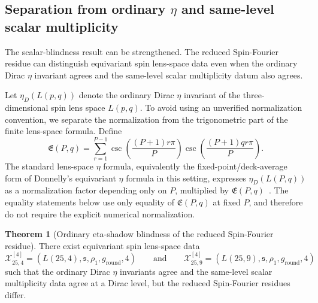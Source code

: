 \documentclass{article}
\theoremstyle{definition}
\newtheorem{theorem}{Theorem}[section]
\numberwithin{equation}{section}
\begin{document}
\subsection{Separation from ordinary $\eta$ and same-level scalar multiplicity}
\label{subsec:check-3B-ordinary-eta-blindness}

The scalar-blindness result can be strengthened.  The reduced Spin-Fourier residue can distinguish equivariant spin lens-space data even when the ordinary Dirac $\eta$ invariant agrees and the same-level scalar multiplicity datum also agrees.

Let $\eta_D(L(p,q))$ denote the ordinary Dirac $\eta$ invariant of the three-dimensional spin lens space $L(p,q)$.  To avoid using an unverified normalization convention, we separate the normalization from the trigonometric part of the finite lens-space formula.  Define
\begin{equation}
\mathfrak E(P,q)
=
\sum_{r=1}^{P-1}
\operatorname{csc}\left(\frac{(P+1)r\pi}{P}\right)
\operatorname{csc}\left(\frac{(P+1)qr\pi}{P}\right).
\end{equation}
The standard lens-space $\eta$ formula, equivalently the fixed-point/deck-average form of Donnelly's equivariant $\eta$ formula in this setting, expresses $\eta_D(L(P,q))$ as a normalization factor depending only on $P$, multiplied by $\mathfrak E(P,q)$~\cite{DonnellyGSpaces}.  The equality statements below use only equality of $\mathfrak E(P,q)$ at fixed $P$, and therefore do not require the explicit numerical normalization.

\begin{theorem}[Ordinary eta-shadow blindness of the reduced Spin-Fourier residue]
There exist equivariant spin lens-space data
\begin{equation}
\mathcal X^{[4]}_{25,4}=\left(L(25,4),\mathfrak s,\rho_1,g_{\text{round}},4\right)
\qquad\text{and}\qquad
\mathcal X^{[4]}_{25,9}=\left(L(25,9),\mathfrak s,\rho_1,g_{\text{round}},4\right)
\end{equation}
such that the ordinary Dirac $\eta$ invariants agree and the same-level scalar multiplicity data agree at a Dirac level, but the reduced Spin-Fourier residues differ.
\end{theorem}
\end{document}
